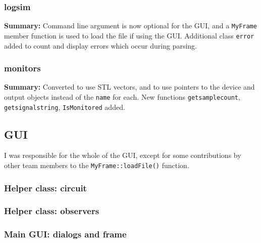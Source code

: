 \documentclass[landscape,twocolumn,a4paper,10pt]{article}
\begin{document}



\subsubsection{logsim}

\textbf{Summary:} Command line argument is now optional for the GUI, and a \texttt{MyFrame} member function is used to load the file if using the GUI. Additional class \texttt{error} added to count and display errors which occur during parsing.




\subsubsection{monitors}

\textbf{Summary:} Converted to use STL vectors, and to use pointers to the device and output objects instead of the \texttt{name} for each. New functions \texttt{getsamplecount}, \texttt{getsignalstring}, \texttt{IsMonitored} added.




\clearpage
\subsection{GUI}

I was responsible for the whole of the GUI, except for some contributions by other team members to the \texttt{MyFrame::loadFile()} function.

\subsubsection{Helper class: circuit}


\subsubsection{Helper class: observers}

\subsubsection{Main GUI: dialogs and frame}


\end{document}
